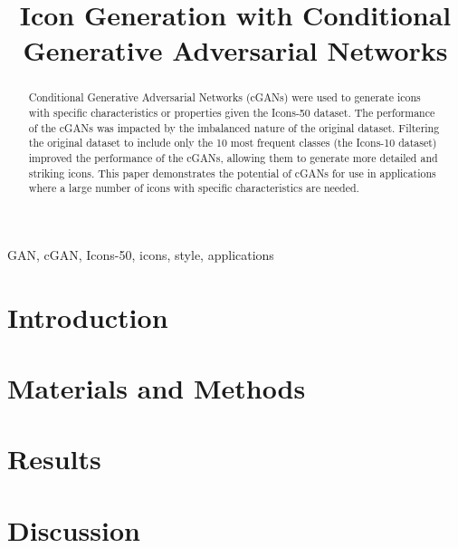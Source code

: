 \documentclass[conference]{IEEEtran}
\begin{document}
    \title{Icon Generation with Conditional Generative Adversarial Networks}

    \author{
    }
    \maketitle

    \begin{abstract}
        Conditional Generative Adversarial Networks (cGANs) were used to generate icons with specific characteristics or properties given the Icons-50 dataset.
        The performance of the cGANs was impacted by the imbalanced nature of the original dataset.
        Filtering the original dataset to include only the 10 most frequent classes (the Icons-10 dataset) improved the performance of the cGANs, allowing them to generate more detailed and striking icons.
        This paper demonstrates the potential of cGANs for use in applications where a large number of icons with specific characteristics are needed.
    \end{abstract}

    \begin{IEEEkeywords}
        GAN, cGAN, Icons-50, icons, style, applications
    \end{IEEEkeywords}


    \section{Introduction}\label{sec:introduction}
    

    \section{Materials and Methods}\label{sec:materials-and-methods}
    


    \section{Results}\label{sec:results}
    


    \section{Discussion}\label{sec:discussion}
\end{document}
